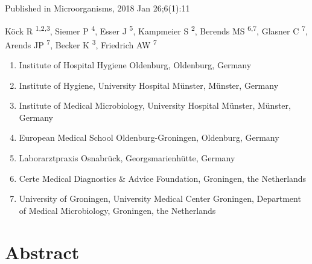 \documentclass[
]{book}
\providecommand{\tightlist}{%
  \setlength{\itemsep}{0pt}\setlength{\parskip}{0pt}}
\begin{document}
Published in Microorganisms, 2018 Jan 26;6(1):11

Köck R \textsuperscript{1,2,3}, Siemer P \textsuperscript{4}, Esser J \textsuperscript{5}, Kampmeier S \textsuperscript{2}, Berends MS \textsuperscript{6,7}, Glasner C \textsuperscript{7}, Arends JP \textsuperscript{7}, Becker K \textsuperscript{3}, Friedrich AW \textsuperscript{7}

\begin{enumerate}
\def\labelenumi{\arabic{enumi}.}
\tightlist
\item
  Institute of Hospital Hygiene Oldenburg, Oldenburg, Germany
\item
  Institute of Hygiene, University Hospital Münster, Münster, Germany
\item
  Institute of Medical Microbiology, University Hospital Münster, Münster, Germany
\item
  European Medical School Oldenburg-Groningen, Oldenburg, Germany
\item
  Laborarztpraxis Osnabrück, Georgsmarienhütte, Germany
\item
  Certe Medical Diagnostics \& Advice Foundation, Groningen, the Netherlands
\item
  University of Groningen, University Medical Center Groningen, Department of Medical Microbiology, Groningen, the Netherlands
\end{enumerate}

\hypertarget{abstract-6}{%
\section{Abstract}\label{abstract-6}}
\end{document}
